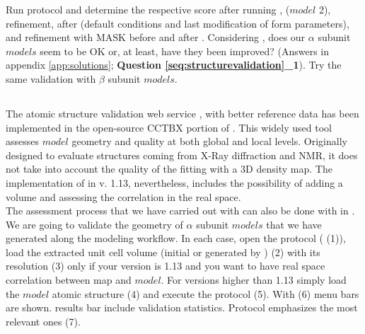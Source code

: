  Run \emringer protocol and determine the respective score after running , \chimera {} ($model$ 2), \coot refinement, \phenix {} after \coot (default conditions and last modification of form parameters), and  refinement with MASK before and after \phenix {}. Considering \emringer {}, does our  $\alpha$ subunit $models$ seem to be OK or, at least, have they been improved? (Answers in appendix \ref{app:solutions}; \textbf{Question \ref{seq:structurevalidation}\_1}). Try the same validation with $\beta$ subunit $models$. \\
 
 \subsection*{\molprobity}
 
 The atomic structure validation web service \molprobity, with better reference data has been implemented in the open-source CCTBX portion of \phenix \citep{williams2018}. This widely used tool assesses $model$ geometry and quality at both global and local levels. Originally designed to evaluate structures coming from X-Ray diffraction and NMR, it does not take into account the quality of the fitting with a 3D density map.  The implementation of \molprobity in \phenix v. 1.13, nevertheless, includes the possibility of adding a volume and assessing the correlation in the real space.\\
 
 The assessment process that we have carried out with \emringer can also be done with \molprobity in \scipion. We are going to validate the geometry of  $\alpha$ subunit $models$ that we have generated along the modeling workflow. In each case, open the  protocol ( (1)), load the extracted unit cell volume (initial or generated by \coot) (2) with its resolution (3) only if your \phenix version is 1.13 and you want to have real space correlation between map and $model$. For \phenix versions higher than 1.13 simply load the $model$ atomic structure (4) and execute the protocol (5). With  (6) menu bars are shown. \molprobity results bar include validation statistics. Protocol  emphasizes the most relevant ones (7).\\
 

